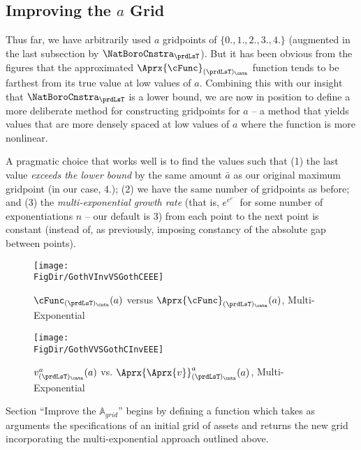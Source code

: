\documentclass[titlepage, headings=optiontotocandhead]{Resources/texmf-local/tex/latex/econtex}
\begin{document}

\hypertarget{improving-the-a-grid}{}
\subsection{Improving the $a$ Grid}\label{subsec:improving-the-a-grid}

Thus far, we have arbitrarily used $a$ gridpoints of $\{0.,1.,2.,3.,4.\}$ (augmented in the last subsection by $\NatBoroCnstra_{\prdLsT}$).  But it has been obvious from the figures that the approximated $\Aprx{\cFunc}_{(\prdLsT)_\cntn}$ function tends to be farthest from its true value at low values of $a$.  Combining this with our insight that $\NatBoroCnstra_{\prdLsT}$ is a lower bound, we are now in position to define a more deliberate method for constructing gridpoints for $a$ -- a method that yields values that are more densely spaced at low values of $a$ where the function is more nonlinear.

A pragmatic choice that works well is to find the values such that (1) the last value \textit{exceeds the lower bound} by the same amount $\bar a$ as our original maximum gridpoint (in our case, 4.); (2) we have the same number of gridpoints as before; and (3) the \textit{multi-exponential growth rate} (that is, $e^{e^{e^{...}}}$ for some number of exponentiations $n$ -- our default is 3) from each point to the next point is constant (instead of, as previously, imposing constancy of the absolute gap between points).

\hypertarget{GothVInvVSGothCEEE}{}
\begin{figure}
  \centerline{\texttt{[image: \\FigDir/GothVInvVSGothCEEE]}}
  \caption{$\cFunc_{(\prdLsT)_\cntn}(a)$ versus
    $\Aprx{\cFunc}_{(\prdLsT)_\cntn}(a)$, Multi-Exponential }
  \label{fig:GothVInvVSGothCEE}
\end{figure}


\hypertarget{GothVVSGothCInvEEE}{}
\begin{figure}
  \texttt{[image: \\FigDir/GothVVSGothCInvEEE]}
  \caption{$v^{a}_{(\prdLsT)_\cntn}(a)$ vs.
    $\Aprx{\Aprx{v}}_{(\prdLsT)_\cntn}^{a}(a)$, Multi-Exponential }
  \label{fig:GothVVSGothCInvEE}
\end{figure}

Section ``Improve the $\mathbb{A}_{grid}$'' begins by defining a function which takes as arguments the specifications of an initial grid of assets and returns the new grid incorporating the multi-exponential approach outlined above.
\end{document}
